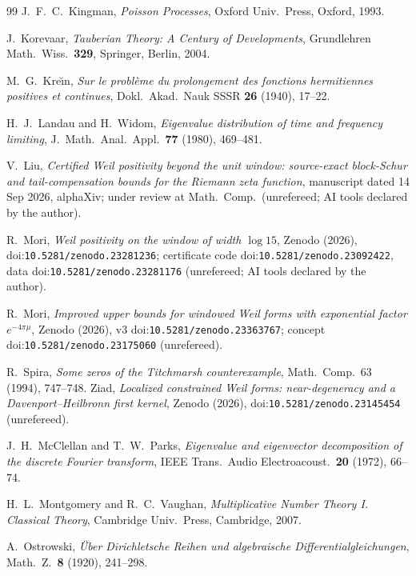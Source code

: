 \documentclass[11pt]{amsart}
\theoremstyle{definition}
\theoremstyle{remark}
\begin{document}
\begin{thebibliography}{99}
 J.~F.~C.~Kingman, \emph{Poisson Processes}, Oxford Univ.~Press, Oxford, 1993.

 J.~Korevaar, \emph{Tauberian Theory: A Century of Developments}, Grundlehren Math.\ Wiss.\ \textbf{329}, Springer, Berlin, 2004.

 M.~G.~Kre\u{\i}n, \emph{Sur le probl\`eme du prolongement des fonctions
hermitiennes positives et continues}, Dokl.~Akad.~Nauk SSSR \textbf{26} (1940), 17--22.

 H.~J.~Landau and H.~Widom, \emph{Eigenvalue distribution of time and frequency
limiting}, J.~Math.\ Anal.\ Appl.\ \textbf{77} (1980), 469--481.

 V.~Liu, \emph{Certified Weil positivity beyond the unit window: source-exact
block-Schur and tail-compensation bounds for the Riemann zeta function}, manuscript dated 14 Sep 2026,
alphaXiv; under review at Math.\ Comp.\ (unrefereed; AI tools declared by the author).

 R.~Mori, \emph{Weil positivity on the window of width $\log 15$}, Zenodo (2026),
doi:\nolinkurl{10.5281/zenodo.23281236}; certificate code doi:\nolinkurl{10.5281/zenodo.23092422}, data
doi:\nolinkurl{10.5281/zenodo.23281176} (unrefereed; AI tools declared by the author).

 R.~Mori, \emph{Improved upper bounds for windowed Weil forms with exponential factor
$e^{-4\pi\mu}$}, Zenodo (2026), v3 doi:\nolinkurl{10.5281/zenodo.23363767}; concept doi:\nolinkurl{10.5281/zenodo.23175060}
(unrefereed).

 R.~Spira, \emph{Some zeros of the Titchmarsh counterexample}, Math.\ Comp.\ 63 (1994), 747--748.
 Ziad, \emph{Localized constrained Weil forms: near-degeneracy and a Davenport--Heilbronn first
kernel}, Zenodo (2026), doi:\nolinkurl{10.5281/zenodo.23145454} (unrefereed).

 J.~H.~McClellan and T.~W.~Parks, \emph{Eigenvalue and eigenvector decomposition of the discrete Fourier transform}, IEEE Trans.\ Audio Electroacoust.\ \textbf{20} (1972), 66--74.

 H.~L.~Montgomery and R.~C.~Vaughan, \emph{Multiplicative Number Theory I. Classical Theory}, Cambridge Univ.~Press, Cambridge, 2007.

 A.~Ostrowski, \emph{\"Uber Dirichletsche Reihen und algebraische Differentialgleichungen}, Math.\ Z.\ \textbf{8} (1920), 241--298.


\end{thebibliography}
\end{document}
